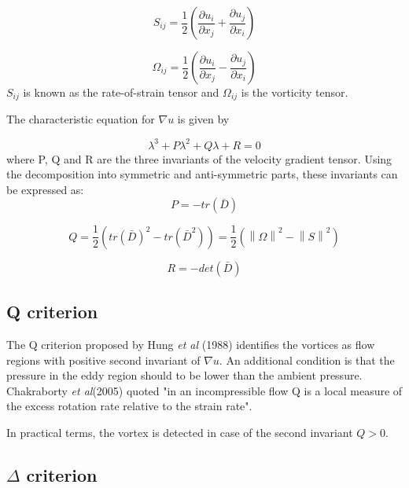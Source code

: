 \documentclass[12pt, a4paper, openany]{memoir}
\newcommand{\norm}[1]{\left\lVert#1\right\rVert}
\begin{document}
\begin{equation}
S_{ij} = \frac{1}{2} \left(\frac{\partial u_i}{\partial x_j} + \frac{\partial u_j}{\partial x_i}\right)
\end{equation}

\begin{equation}
\Omega_{ij} = \frac{1}{2} \left(\frac{\partial u_i}{\partial x_j} - \frac{\partial u_j}{\partial x_i}\right)
\end{equation}
$S_{ij}$ is known as the rate-of-strain tensor and $\Omega_{ij}$ is the vorticity tensor.

The characteristic equation for $\nabla u$ is given by

\begin{equation}
\lambda^3 + P \lambda^2 + Q \lambda + R = 0
\end{equation}
where P, Q and R are the three invariants of the velocity gradient tensor. Using the decomposition into symmetric and anti-symmetric parts, these invariants can be expressed as:
\begin{equation}
P = -tr(\bar{D})
\end{equation}

\begin{equation}
Q = \frac{1}{2} (tr(\bar{D})^2 -tr(\bar{D}^2)) = \frac{1}{2} (\norm{\Omega}^2 - \norm{S}^2)
\end{equation}

\begin{equation}
R = -det(\bar{D})
\end{equation}

\subsection{Q criterion}

The Q criterion proposed by Hung \textit{et al} (1988) identifies the vortices as flow regions with positive second invariant of $\nabla u$. An additional condition is that the pressure in the eddy region should to be lower than the ambient pressure. Chakraborty \textit{et al}(2005) \cite{chakra2005} quoted "in an incompressible flow Q is a local measure of the excess rotation rate relative to the strain rate".

In practical terms, the vortex is detected in case of the second invariant $Q > 0$.

\subsection{$\Delta$ criterion}
\end{document}
